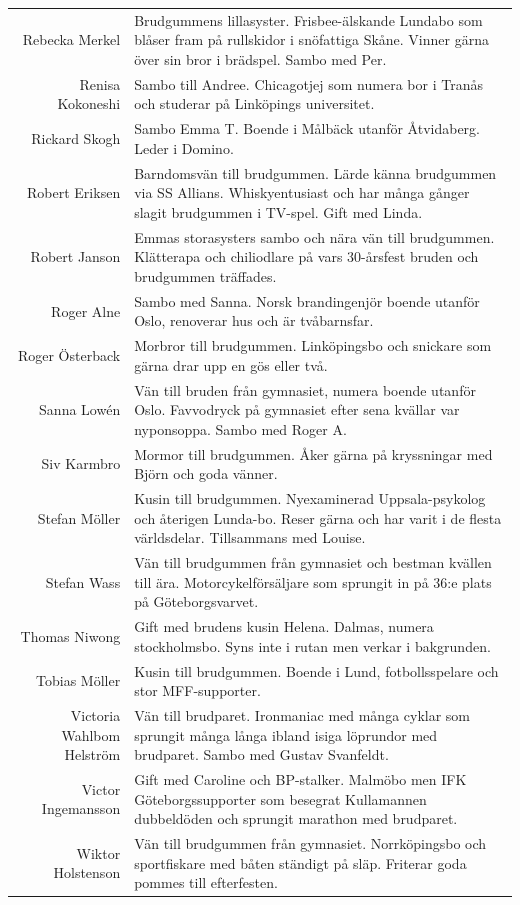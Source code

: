 \documentclass[a5paper]{article}
\begin{document}
\begin{longtable}[l]{N|L}
				Rebecka Merkel	&	Brudgummens lillasyster. Frisbee-älskande Lundabo som blåser fram på rullskidor i snöfattiga Skåne. Vinner gärna över sin bror i brädspel. Sambo med Per. 	\\
				Renisa Kokoneshi	&	Sambo till Andree. Chicagotjej som numera bor i Tranås och studerar på Linköpings universitet.	\\
				Rickard Skogh	&	Sambo Emma T. Boende i Målbäck utanför Åtvidaberg. Leder i Domino. \\
				Robert Eriksen	&	Barndomsvän till brudgummen. Lärde känna brudgummen via SS Allians. Whiskyentusiast och har många gånger slagit brudgummen i TV-spel. Gift med Linda. 	\\
				Robert Janson	&	Emmas storasysters sambo och nära vän till brudgummen. Klätterapa och chiliodlare på vars 30-årsfest bruden och brudgummen träffades.	\\
				Roger Alne	&	Sambo med Sanna. Norsk brandingenjör boende utanför Oslo, renoverar hus och är tvåbarnsfar.	\\
				Roger Österback	&	Morbror till brudgummen. Linköpingsbo och snickare som gärna drar upp en gös eller två.	\\
				Sanna Lowén	&	Vän till bruden från gymnasiet, numera boende utanför Oslo. Favvodryck på gymnasiet efter sena kvällar var nyponsoppa. Sambo med Roger A.	\\
				Siv Karmbro	&	Mormor till brudgummen. Åker gärna på kryssningar med Björn och goda vänner.	\\
				Stefan Möller	&	Kusin till brudgummen. Nyexaminerad Uppsala-psykolog och återigen Lunda-bo. Reser gärna och har varit i de flesta världsdelar. Tillsammans med Louise.	\\
				Stefan Wass	&	Vän till brudgummen från gymnasiet och bestman kvällen till ära. Motorcykelförsäljare som sprungit in på 36:e plats på Göteborgsvarvet.	\\
				Thomas Niwong	&	Gift med brudens kusin Helena. Dalmas, numera stockholmsbo. Syns inte i rutan men verkar i bakgrunden.	\\
				Tobias Möller	&	Kusin till brudgummen. Boende i Lund, fotbollsspelare och stor MFF-supporter.	\\
				Victoria Wahlbom Helström	&	Vän till brudparet. Ironmaniac med många cyklar som sprungit många långa ibland isiga löprundor med brudparet. Sambo med Gustav Svanfeldt.	\\
				Victor Ingemansson	&	Gift med Caroline och BP-stalker. Malmöbo men IFK Göteborgssupporter som besegrat Kullamannen dubbeldöden och sprungit marathon med brudparet.	\\
				Wiktor Holstenson	&	Vän till brudgummen från gymnasiet. Norrköpingsbo och sportfiskare med båten ständigt på släp. Friterar goda pommes till efterfesten. 	\\
		\end{longtable}
	
\end{document}
